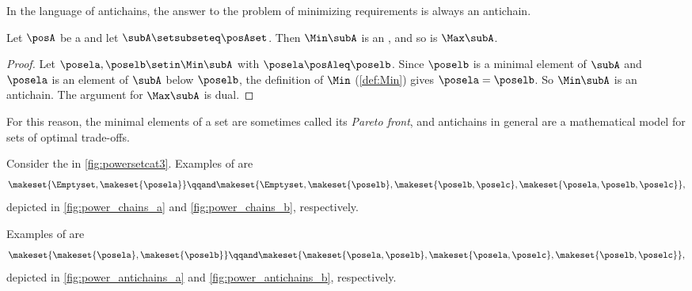 In the language of antichains, the answer to the problem of minimizing requirements is always an antichain.

\begin{lemma}
    \label{lem:Min-is-antichain}
    Let $\posA$ be a  and let $\subA \setsubseteq \posAset$.
    Then $\Min \subA$ is an , and so is $\Max \subA$.
\end{lemma}
\begin{proof}
    Let $\posela, \poselb \setin \Min \subA$ with $\posela \posAleq \poselb$.
    Since $\poselb$ is a minimal element of $\subA$ and $\posela$ is an element of $\subA$ below $\poselb$, the definition of $\Min$ (\cref{def:Min}) gives $\posela = \poselb$.
    So $\Min \subA$ is an antichain.
    The argument for $\Max \subA$ is dual.
\end{proof}

For this reason, the minimal elements of a set are sometimes called its \emph{Pareto front}, and antichains in general are a mathematical model for sets of optimal trade-offs.

\begin{example}
    Consider the  in \cref{fig:powersetcat3}.
    Examples of  are
    \begin{equation}\label{eq:example-chain}
        \makeset{\Emptyset,\makeset{\posela}}
        \qqand
        \makeset{\Emptyset,\makeset{\poselb},\makeset{\poselb,\poselc},\makeset{\posela,\poselb,\poselc}},
    \end{equation}
    depicted in \cref{fig:power_chains_a} and \cref{fig:power_chains_b}, respectively.

    Examples of  are
    \begin{equation}\label{eq:examples-antichain}
        \makeset{\makeset{\posela},\makeset{\poselb}}
        \qqand
        \makeset{\makeset{\posela,\poselb}, \makeset{\posela,\poselc}, \makeset{\poselb,\poselc}},
    \end{equation}
    depicted in \cref{fig:power_antichains_a} and \cref{fig:power_antichains_b}, respectively.
\end{example}

\begin{marginfigure}



    \caption{Examples of  (a-b) and  (c-d) in the  $\powerset\makeset{\posela,\poselb,\poselc}$.}
\end{marginfigure}

